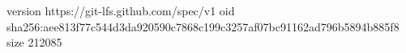 version https://git-lfs.github.com/spec/v1
oid sha256:aee813f77c544d3da920590c7868c199c3257af07bc91162ad796b5894b885f8
size 212085
